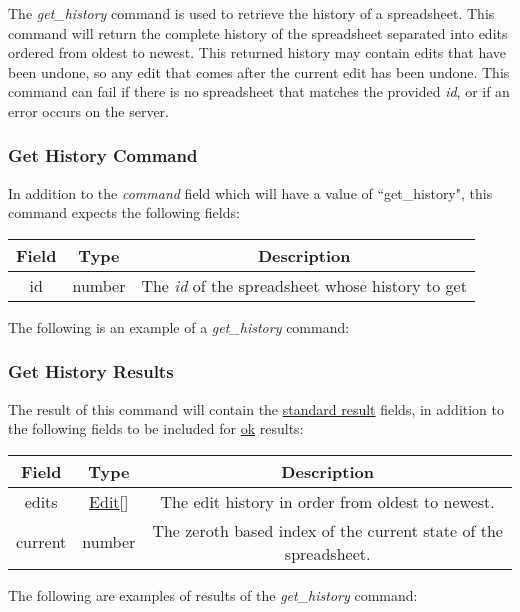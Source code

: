 The \emph{get\_history} command is used to retrieve the history of a spreadsheet. 
This command will return the complete history of the spreadsheet separated 
into edits ordered from oldest to newest. This returned history may contain 
edits that have been undone, so any edit that comes after the current edit 
has been undone. This command can fail if there is no spreadsheet that matches 
the provided \emph{id}, or if an error occurs on the server.

\subsubsection{Get History Command}
In addition to the \emph{command} field which will have a value of ``get\_history", this command expects the following fields:
\begin{table}[H]
    \begin{center}
        \begin{tabular}{|c|c|c|}\hline
            Field & Type & Description \\\hline
            id & number & The \emph{id} of the spreadsheet whose history to get \\\hline
        \end{tabular}
    \end{center}
\end{table}

The following is an example of a \emph{get\_history} command:


\subsubsection{Get History Results}
The result of this command will contain the \hyperref[sec:message:result]{standard result} fields, in addition to the following fields to be included for \underline{ok} results:
\begin{table}[H]
    \begin{center}
        \begin{tabular}{|c|c|c|}\hline
            Field & Type & Description \\\hline
            edits & \hyperref[sec:message:edits]{Edit}[] & The edit history in order from oldest to newest. \\\hline
            current & number & The zeroth based index of the current state of the spreadsheet. \\\hline
        \end{tabular}
    \end{center}
\end{table}

The following are examples of results of the \emph{get\_history} command:



